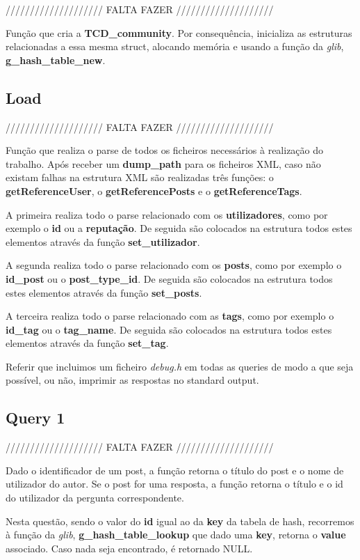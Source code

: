 \documentclass[a4paper]{article}
\begin{document}
//////////////////// FALTA FAZER ////////////////////

Função que cria a \textbf{TCD\_community}. Por consequência, inicializa
as estruturas relacionadas a essa mesma struct, alocando memória e usando
a função da \textit{glib}, \textbf{g\_hash\_table\_new}.

\subsection{Load}

//////////////////// FALTA FAZER ////////////////////

Função que realiza o parse de todos os ficheiros necessários à realização
do trabalho. Após receber um \textbf{dump\_path} para os ficheiros XML,
caso não existam falhas na estrutura XML são realizadas três funções:
o \textbf{getReferenceUser}, o \textbf{getReferencePosts} e o
\textbf{getReferenceTags}.

A primeira realiza todo o parse relacionado com os \textbf{utilizadores}, 
como por exemplo o \textbf{id} ou a \textbf{reputação}. De seguida são 
colocados na estrutura todos estes elementos através da função
\textbf{set\_utilizador}.

A segunda realiza todo o parse relacionado com os \textbf{posts}, 
como por exemplo o \textbf{id\_post} ou o \textbf{post\_type\_id}. 
De seguida são colocados na estrutura todos estes elementos através da 
função \textbf{set\_posts}.

A terceira realiza todo o parse relacionado com as \textbf{tags}, 
como por exemplo o \textbf{id\_tag} ou o \textbf{tag\_name}. 
De seguida são colocados na estrutura todos estes elementos através da 
função \textbf{set\_tag}.

Referir que incluimos um ficheiro \textit{debug.h} em todas as queries 
de modo a que seja possível, ou não, imprimir as respostas no 
standard output.

\subsection{Query 1}

//////////////////// FALTA FAZER ////////////////////

Dado o identificador de um post, a função retorna o título do post 
e o nome de utilizador do autor. Se o post for uma resposta, a função
retorna o título e o id do utilizador da pergunta correspondente.

Nesta questão, sendo o valor do \textbf{id} igual ao da \textbf{key} 
da tabela de hash, recorremos à função da \textit{glib},
\textbf{g\_hash\_table\_lookup} que dado uma \textbf{key},
retorna o \textbf{value} associado. Caso nada seja encontrado,
é retornado NULL.
\end{document}
